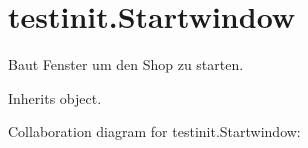 \hypertarget{classtestinit_1_1Startwindow}{}\section{testinit.\+Startwindow}
\label{classtestinit_1_1Startwindow}


Baut Fenster um den Shop zu starten.  




Inherits object.



Collaboration diagram for testinit.\+Startwindow\+:
